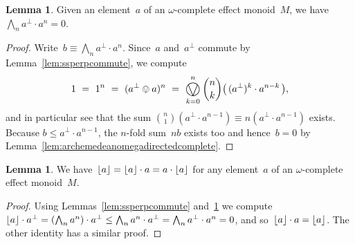 \documentclass[10pt,conference]{IEEEtran}
\DeclarePairedDelimiter{\floor}{\lfloor}{\rfloor}
\newcounter{counter}
\theoremstyle{definition}
\newtheorem{lemma}[counter]{Lemma}
\newcommand{\bigovee}{\mathop{\vphantom{\sum}\mathchoice%
        {\vcenter{\hbox{\huge $\ovee$}}}%
        {\vcenter{\hbox{\Large $\ovee$}}}%
        {\ovee}{\ovee}}\displaylimits}
\begin{document}
\begin{lemma}
    \label{lem:infaperpan}
Given an element~$a$ of an $\omega$-complete
effect monoid~$M$,
we have $\bigwedge_n a^\perp\cdot  a^n = 0$.
\end{lemma}
\begin{proof}
Write~$b \equiv \bigwedge_n a^\perp \cdot a^n$.
Since~$a$ and~$a^\perp$ commute by Lemma~\ref{lem:ssperpcommute},
    we compute
\begin{equation*}
1\ =\ 1^n\ =\ (a^\perp \ovee a)^n
    \ =\ \bigovee_{k=0}^n \binom{n}{k}\bigl(\, (a^\perp)^k\cdot a^{n-k}
    \,\bigr),
\end{equation*}
and in particular see
    that the sum $\binom{n}{1} (a^\perp \cdot a^{n-1})\equiv 
    n(a^\perp \cdot a^{n-1})$ exists.
Because $b\leq a^\perp \cdot a^{n-1}$,
the $n$-fold sum~$nb$ exists too and hence~$b=0$
    by Lemma~\ref{lem:archemedeanomegadirectedcomplete}.
\end{proof}
\begin{lemma}
\label{lem:flooraa}
    We have~$\floor{a}=\floor{a}\cdot a = a \cdot \floor{a}$
for any element~$a$ of an $\omega$-complete
effect monoid~$M$.
\end{lemma}
\begin{proof}
Using Lemmas~\ref{lem:ssperpcommute} and~\ref{lem:infaperpan} we compute $\floor{a} \cdot a^\perp
    = (\bigwedge_n a^n) \cdot a^\perp
\leq \bigwedge_n  a^n \cdot a^\perp 
= \bigwedge_n a^\perp \cdot a^n 
= 0$,
    and so~$\floor{a}\cdot a=\floor{a}$.
The other identity
    has a similar proof.
\end{proof}
\end{document}
